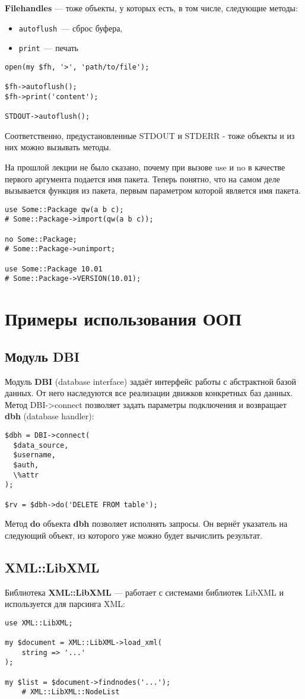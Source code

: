 \textbf{Filehandles} --- тоже объекты, у которых есть, в том числе, следующие методы:
\begin{itemize}
  \item \verb|autoflush|~--- сброс буфера,
  \item \verb|print|~--- печать
\end{itemize}

\begin{verbatim}
open(my $fh, '>', 'path/to/file');

$fh->autoflush();
$fh->print('content');

STDOUT->autoflush();
\end{verbatim}
Соответственно, предустановленные STDOUT и STDERR - тоже объекты и из них можно вызывать методы.

На прошлой лекции не было сказано, почему при вызове use и no в качестве первого аргумента подается имя пакета. Теперь понятно, что на самом деле вызывается функция из пакета, первым параметром которой является имя пакета.
\begin{verbatim}
use Some::Package qw(a b c);
# Some::Package->import(qw(a b c));

no Some::Package;
# Some::Package->unimport;

use Some::Package 10.01
# Some::Package->VERSION(10.01);
\end{verbatim}

\section{Примеры использования ООП}%
\subsection{Модуль DBI}
Модуль \textbf{DBI} (database interface) задаёт интерфейс работы с абстрактной базой данных. От него наследуются все реализации движков конкретных баз данных. Метод DBI->connect позволяет задать параметры подключения и возвращает  \textbf{dbh} (database handler):
\begin{verbatim}
$dbh = DBI->connect(
  $data_source,
  $username,
  $auth,
  \%attr
);

$rv = $dbh->do('DELETE FROM table');
\end{verbatim}
Метод \textbf{do} объекта \textbf{dbh} позволяет исполнять запросы. Он вернёт указатель на следующий объект, из которого уже можно будет вычислить результат.


\subsection{XML::LibXML}%
Библиотека \textbf{XML::LibXML} --- работает с системами библиотек LibXML и используется для парсинга XML:
\begin{verbatim}
use XML::LibXML;

my $document = XML::LibXML->load_xml(
    string => '...'
);

my $list = $document->findnodes('...');
    # XML::LibXML::NodeList
\end{verbatim}

